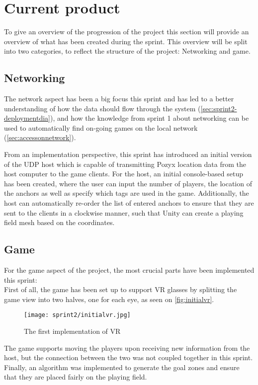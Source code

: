\section{Current product}
To give an overview of the progression of the project this section will provide an overview of what has been created during the sprint.
This overview will be split into two categories, to reflect the structure of the project: Networking and game.

\subsection{Networking}
The network aspect has been a big focus this sprint and has led to a better understanding of how the data should flow through the system (\autoref{sec:sprint2-deploymentdia}), and how the knowledge from sprint 1 about networking can be used to automatically find on-going games on the local network (\autoref{sec:accessonnetwork}).

From an implementation perspective, this sprint has introduced an initial version of the UDP host which is capable of transmitting Pozyx location data from the host computer to the game clients.
For the host, an initial console-based setup has been created, where the user can input the number of players, the location of the anchors as well as specify which tags are used in the game.
Additionally, the host can automatically re-order the list of entered anchors to ensure that they are sent to the clients in a clockwise manner, such that Unity can create a playing field mesh based on the coordinates.

\subsection{Game}
For the game aspect of the project, the most crucial parts have been implemented this sprint:\\
First of all, the game has been set up to support VR glasses by splitting the game view into two halves, one for each eye, as seen on \autoref{fig:initialvr}.

\begin{figure}[H]
    \centering
    \texttt{[image: sprint2/initialvr.jpg]}
    \caption{The first implementation of VR}
    \label{fig:initialvr}
\end{figure}

The game supports moving the players upon receiving new information from the host, but the connection between the two was not coupled together in this sprint.
Finally, an algorithm was implemented to generate the goal zones and ensure that they are placed fairly on the playing field.
